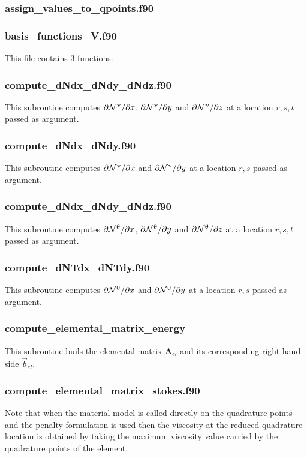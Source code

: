  \subsubsection{assign\_values\_to\_qpoints.f90}

 \subsubsection{basis\_functions\_V.f90}
 This file contains 3 functions: 
 \subsubsection{compute\_dNdx\_dNdy\_dNdz.f90}
 This subroutine computes $\partial{{\mathcal{N}}^\upnu}/\partial x$, $\partial{{\mathcal{N}}^\upnu}/\partial y$ and
 $\partial{{\mathcal{N}}^\upnu}/\partial z$ at a location $r,s,t$ passed as argument.
 \subsubsection{compute\_dNdx\_dNdy.f90}
 This subroutine computes $\partial{{\mathcal{N}}^\upnu}/\partial x$ and $\partial{{\mathcal{N}}^\upnu}/\partial y$
 at a location $r,s$ passed as argument.
 \subsubsection{compute\_dNdx\_dNdy\_dNdz.f90}
 This subroutine computes $\partial{{\mathcal{N}}^\uptheta}/\partial x$, 
 $\partial{{\mathcal{N}}^\uptheta}/\partial y$ and
 $\partial{{\mathcal{N}}^\uptheta}/\partial z$ at a location $r,s,t$ passed as argument.
 \subsubsection{compute\_dNTdx\_dNTdy.f90}
 This subroutine computes $\partial{{\mathcal{N}}^\uptheta}/\partial x$ 
 and $\partial{{\mathcal{N}}^\uptheta}/\partial y$  at a location $r,s$ passed as argument.
 \subsubsection{compute\_elemental\_matrix\_energy}
 This subroutine buils the elemental matrix ${\bm A}_{el}$ and its corresponding 
 right hand side $\vec{b}_{el}$. 
 \subsubsection{compute\_elemental\_matrix\_stokes.f90}
 Note that when the material model is called directly on the quadrature points and 
 the penalty formulation is used then the viscosity at the reduced quadrature location 
 is obtained by taking the maximum viscosity value carried by the quadrature points of 
 the element. 
